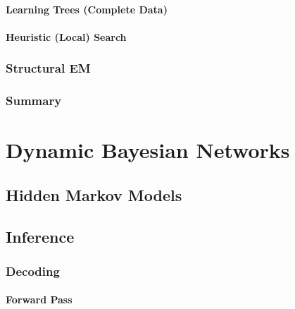             \subsubsection{Learning Trees (Complete Data)} %

            \subsubsection{Heuristic (Local) Search} %

        \subsection{Structural EM} %

        \subsection{Summary} %

\chapter{Dynamic Bayesian Networks} %

    \section{Hidden Markov Models} %

    \section{Inference} %

        \subsection{Decoding} %

            \subsubsection{Forward Pass} %


